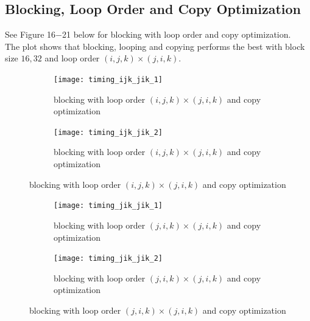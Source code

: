 \documentclass[12pt]{article}
\numberwithin{equation}{section}
\begin{document}
\subsection{Blocking, Loop Order and Copy Optimization}

See Figure 16$-$21 below for blocking with loop order and copy optimization.
\\
The plot shows that blocking, looping and copying performs the best with block size $16, 32$ and loop order $(i, j, k)\times(j, i, k)$.

\begin{figure}[!ht]
   \begin{subfigure}
      \centering
        \begin{center}
      \texttt{[image: timing\_ijk\_jik\_1]}
        \end{center}
      \label{aload0}
      \caption{blocking with loop order $(i, j, k)\times(j, i, k)$ and copy optimization}
  \end{subfigure}
  \begin{subfigure}
      \centering
        \begin{center}
      \texttt{[image: timing\_ijk\_jik\_2]}
        \end{center}
      \label{aload1}
      \caption{blocking with loop order $(i, j, k)\times(j, i, k)$ and copy optimization}
  \end{subfigure}

\end{figure}

\begin{figure}[!ht]
   \begin{subfigure}
      \centering
        \begin{center}
      \texttt{[image: timing\_jik\_jik\_1]}
        \end{center}
      \label{aload0}
      \caption{blocking with loop order $(j, i, k)\times(j, i, k)$ and copy optimization}
  \end{subfigure}
  \begin{subfigure}
      \centering
        \begin{center}
      \texttt{[image: timing\_jik\_jik\_2]}
        \end{center}
      \label{aload1}
      \caption{blocking with loop order $(j, i, k)\times(j, i, k)$ and copy optimization}
  \end{subfigure}

\end{figure}
\end{document}
